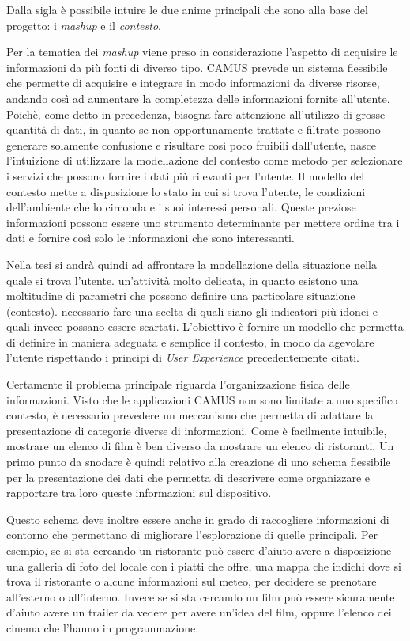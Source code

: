 Dalla sigla è possibile intuire le due anime principali che sono alla base del progetto: i \emph{mashup} e il \emph{contesto}.

Per la tematica dei \emph{mashup} viene preso in considerazione l'aspetto di acquisire le informazioni da più fonti di diverso tipo. CAMUS prevede un sistema flessibile che permette di acquisire e integrare in modo  informazioni da diverse risorse, andando così ad aumentare la completezza delle informazioni fornite all'utente. Poichè, come detto in precedenza, bisogna fare attenzione all'utilizzo di grosse quantità di dati, in quanto se non opportunamente trattate e filtrate possono generare solamente confusione e risultare così poco fruibili dall'utente, nasce l'intuizione di utilizzare la modellazione del contesto come metodo per selezionare i servizi che possono fornire i dati più rilevanti per l'utente. Il modello del contesto mette a disposizione lo stato in cui si trova l'utente, le condizioni dell'ambiente che lo circonda e i suoi interessi personali. Queste preziose informazioni possono essere uno strumento determinante per mettere ordine tra i dati e fornire così solo le informazioni che sono interessanti.

Nella tesi si andrà quindi ad affrontare la modellazione della situazione nella quale si trova l'utente. \upe un'attività molto delicata, in quanto esistono una moltitudine di parametri che possono definire una particolare situazione (contesto). \upe necessario fare una scelta di quali siano gli indicatori più idonei e quali invece possano essere scartati. L'obiettivo è fornire un modello che permetta di definire in maniera adeguata e semplice il contesto, in modo da agevolare l'utente rispettando i principi di \emph{User Experience} precedentemente citati.

Certamente il problema principale riguarda l'organizzazione fisica delle informazioni. Visto che le applicazioni CAMUS non sono limitate a uno specifico contesto, è necessario prevedere un meccanismo che permetta di adattare la presentazione di categorie diverse di informazioni. Come è facilmente intuibile, mostrare un elenco di film è ben diverso da mostrare un elenco di ristoranti. Un primo punto da snodare è quindi relativo alla creazione di uno schema flessibile per la presentazione dei dati che permetta di descrivere come organizzare e rapportare tra loro queste informazioni sul dispositivo.

Questo schema deve inoltre essere anche in grado di raccogliere informazioni di contorno che permettano di migliorare l'esplorazione di quelle principali. Per esempio, se si sta cercando un ristorante può essere d'aiuto avere a disposizione una galleria di foto del locale con i piatti che offre, una mappa che indichi dove si trova il ristorante o alcune informazioni sul meteo, per decidere se prenotare all'esterno o all'interno. Invece se si sta cercando un film può essere sicuramente d'aiuto avere un trailer da vedere per avere un'idea del film, oppure l'elenco dei cinema che l'hanno in programmazione.

